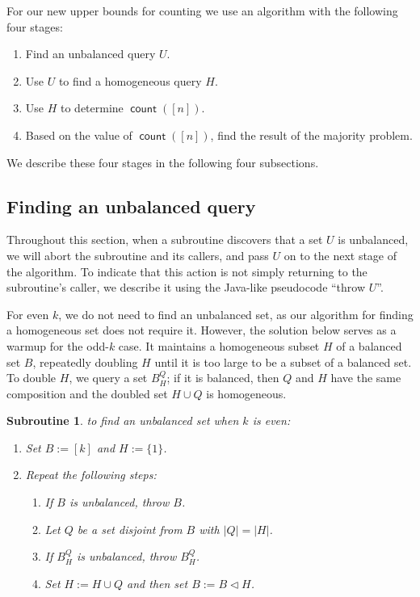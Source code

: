 \documentclass[11pt]{llncs}
\newcommand{\qcount}{\operatorname{\mathsf{count}}}
\newcommand{\inject}{\triangleleft}
\newcommand{\assign}{:=}
\newtheorem{subroutine}{Subroutine}
\begin{document}
For our new upper bounds for counting we use an algorithm with the following four stages:
\begin{enumerate}
\item Find an unbalanced query $U$.
\item Use $U$ to find a homogeneous query $H$.
\item Use $H$ to determine $\qcount([n])$.
\item Based on the value of $\qcount([n])$, find the result of the majority problem.
\end{enumerate}

We describe these four stages in the following four subsections.

\subsection{Finding an unbalanced query}
Throughout this section, when a subroutine discovers that a set $U$ is unbalanced, we will abort the subroutine and its callers, and pass $U$ on to the next stage of the algorithm. To indicate that this action is not simply returning to the subroutine's caller, we describe it using the Java-like pseudocode ``throw $U$''.

For even $k$, we do not need to find an unbalanced set, as our algorithm for finding a homogeneous set does not require it. However, the solution below serves as a warmup for the odd-$k$ case. It maintains a homogeneous subset $H$ of a balanced set $B$, repeatedly doubling $H$ until it is too large to be a subset of a balanced set. To double $H$, we query a set $B_H^Q$; if it is balanced, then $Q$ and $H$ have the same composition and the doubled set $H\cup Q$ is homogeneous.
\ifFull
\newpage
\fi
\begin{subroutine}
\label{sbr:unbal-even}
to find an unbalanced set when $k$ is even:
\begin{enumerate}
\item Set $B\assign [k]$ and $H\assign\{1\}$.
\item Repeat the following steps:
\begin{enumerate}
\item If $B$ is unbalanced, throw $B$.
\item Let $Q$ be a set disjoint from $B$ with $|Q|=|H|$.
\item If $B_H^Q$ is unbalanced, throw $B_H^Q$.
\item Set $H\assign H\cup Q$ and then set $B\assign B\inject H$.
\end{enumerate}
\end{enumerate}
\end{subroutine}
\end{document}
